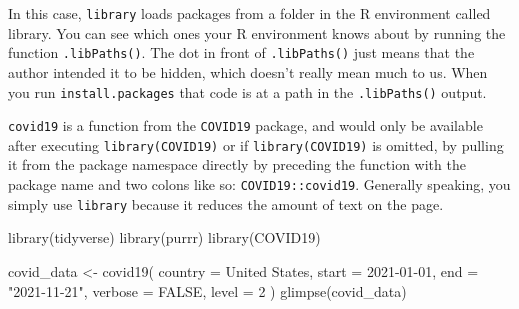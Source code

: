 \documentclass[
]{book}
\newenvironment{Shaded}{\begin{snugshade}}{\end{snugshade}}
\newcommand{\AttributeTok}[1]{\textcolor[rgb]{0.77,0.63,0.00}{#1}}
\newcommand{\ConstantTok}[1]{\textcolor[rgb]{0.00,0.00,0.00}{#1}}
\newcommand{\DecValTok}[1]{\textcolor[rgb]{0.00,0.00,0.81}{#1}}
\newcommand{\FunctionTok}[1]{\textcolor[rgb]{0.00,0.00,0.00}{#1}}
\newcommand{\NormalTok}[1]{#1}
\newcommand{\OtherTok}[1]{\textcolor[rgb]{0.56,0.35,0.01}{#1}}
\newcommand{\StringTok}[1]{\textcolor[rgb]{0.31,0.60,0.02}{#1}}
\begin{document}
In this case, \texttt{library} loads packages from a folder in the R environment called library. You can see which ones your R environment knows about by running the function \texttt{.libPaths()}. The dot in front of \texttt{.libPaths()} just means that the author intended it to be hidden, which doesn't really mean much to us. When you run \texttt{install.packages} that code is at a path in the \texttt{.libPaths()} output.

\texttt{covid19} is a function from the \texttt{COVID19} package, and would only be available after executing \texttt{library(COVID19)} or if \texttt{library(COVID19)} is omitted, by pulling it from the package namespace directly by preceding the function with the package name and two colons like so: \texttt{COVID19::covid19}. Generally speaking, you simply use \texttt{library} because it reduces the amount of text on the page.

\begin{Shaded}
\begin{Highlighting}[]
\FunctionTok{library}\NormalTok{(tidyverse)}
\FunctionTok{library}\NormalTok{(purrr)}
\FunctionTok{library}\NormalTok{(COVID19)}
\end{Highlighting}
\end{Shaded}

\begin{Shaded}
\begin{Highlighting}[]
\NormalTok{covid\_data }\OtherTok{\textless{}{-}} \FunctionTok{covid19}\NormalTok{(}
    \AttributeTok{country =} \StringTok{\textquotesingle{}United States\textquotesingle{}}\NormalTok{, }
    \AttributeTok{start =} \StringTok{\textquotesingle{}2021{-}01{-}01\textquotesingle{}}\NormalTok{, }
    \AttributeTok{end =} \StringTok{"2021{-}11{-}21"}\NormalTok{,}
    \AttributeTok{verbose =} \ConstantTok{FALSE}\NormalTok{, }
    \AttributeTok{level =} \DecValTok{2}
\NormalTok{)}
\FunctionTok{glimpse}\NormalTok{(covid\_data)}
\end{Highlighting}
\end{Shaded}
\end{document}

